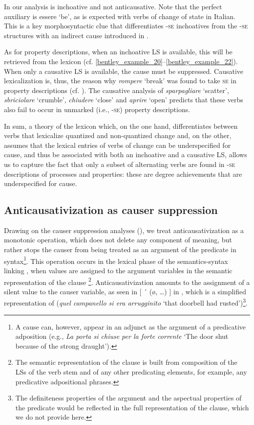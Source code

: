 \documentclass[output=paper,colorlinks,citecolor=brown
]{langscibook}
\begin{document}
In our analysis  is inchoative and not anticausative. Note that the perfect auxiliary is essere ‘be’, as is expected with verbs of change of state in Italian. This is a key morphosyntactic clue that differentiates -\textsc{se} inchoatives from the -\textsc{se} structures with an indirect cause introduced in . 

As for property descriptions, when an inchoative LS is available, this will be retrieved from the
lexicon (cf. \ref{bentley_example_20}--\ref{bentley_example_22}). When only a causative LS is available, the cause must be suppressed. Causative lexicalization is, thus, the reason why \textit{rompere} ‘break’ was found to take \textsc{se} in property descriptions (cf. ). The causative analysis of \textit{sparpagliare} ‘scatter’, \textit{sbriciolare} ‘crumble’, \textit{chiudere} ‘close’ and \textit{aprire} ‘open’ predicts that these verbs also fail to occur in unmarked (i.e., -\textsc{se}) property descriptions.

In sum, a theory of the lexicon which, on the one hand, differentiates between verbs that lexicalize quantized and non-quantized change and, on the other, assumes that the lexical entries of verbs of change can be underspecified for cause, and thus be associated with both an inchoative and a causative LS, allows us to capture the fact that only a subset of alternating verbs are found in -\textsc{se} descriptions of processes and properties: these are degree achievements that are underspecified for cause.

\subsection{Anticausativization as causer suppression}
\label{bentley_section_5.4}

Drawing on the causer suppression analyses (), we treat anticausativization as a monotonic
operation, which does not delete any component of meaning, but rather stops the causer from being
treated as an argument of the predicate in syntax\footnote{A cause can, however, appear in an
  adjunct as the argument of a predicative adposition (e.g., \textit{La porta si chiuse per la forte
    corrente} ‘The door shut because of the strong draught’). }.  This operation occurs in the
lexical phase of the semantics-syntax linking \citep[116--125]{vanvalin2023principles}, when values
are assigned to the argument variables in the semantic representation of the clause \footnote{The
  semantic representation of the clause is built from composition of the LSs of the verb stem and of
  any other predicating elements, for example, any predicative adpositional
  phrases.}. Anticausativization amounts to the assignment of a silent value to the causer variable,
as seen in $\lbrack$ ´ (\o,  \ldots ) $\rbrack$ in , which is a simplified representation of  (\textit{quel campanello si era arrugginito} ‘that doorbell had rusted’)\footnote{The definiteness properties of the argument and the aspectual properties of the predicate would be reflected in the full representation of the clause, which we do not provide here.}.
\end{document}
